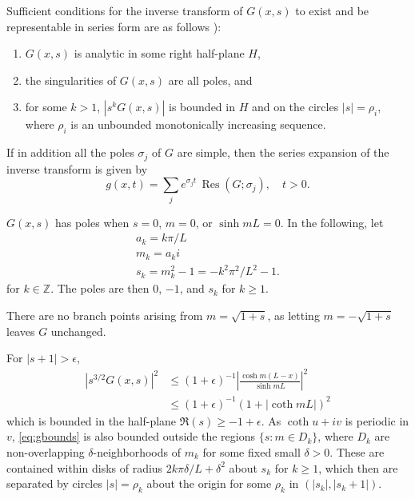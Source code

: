 \documentclass[parskip=half]{scrartcl}
\DeclareMathOperator{\Res}{Res}
\begin{document}
Sufficient conditions for the inverse transform of $G(x,s)$ to exist
and be representable in series form are as follows
\parencite[][Theorem 4]{churchill1937}):
\begin{enumerate}
\item
    $G(x, s)$ is analytic in some right half-plane $H$,
\item
    the singularities of $G(x, s)$ are all poles, and
\item for some $k>1$, $|s^k G(x, s)|$ is bounded in $H$ and
    on the circles $|s|=\rho_i$, where $\rho_i$ is an unbounded monotonically
    increasing sequence.
\end{enumerate}
If in addition all the poles $\sigma_j$ of $G$ are simple, then
the series expansion of the inverse transform is given by
\begin{equation}
    g(x,t) = \sum_j e^{\sigma_j t}\, \Res(G;\sigma_j),\quad t>0.
\end{equation}

$G(x,s)$ has poles when $s=0$, $m=0$, or $\sinh mL=0$.
In the following, let
\begin{gather*}
    a_k = k\pi /L\\
    m_k = a_k i\\
    s_k = m_k^2 -1 = -k^2\pi^2/L^2-1.
\end{gather*}
for $k\in\mathbb{Z}$.
The poles are then $0$, $-1$, and $s_k$ for $k\geq 1$.

There are no branch points
arising from $m=\sqrt{1+s}$, as letting $m=-\sqrt{1+s}$ leaves $G$ unchanged.

For $|s+1|>\epsilon$,
\begin{equation}
    \begin{aligned}
	|s^{3/2}G(x,s)|^2
	    & \leq (1+\epsilon)^{-1} \left| \frac{\cosh m(L-x)}{\sinh mL} \right|^2
	\\
	    & \leq (1+\epsilon)^{-1} (1+|\coth mL|)^2
    \label{eq:gbounds}
    \end{aligned}
\end{equation}
which is bounded in the half-plane $\Re(s) \geq  -1+\epsilon$. 
As $\coth u+iv$ is periodic in $v$, \eqref{eq:gbounds} is also bounded outside
the regions $\{s: m\in D_k\}$, where $D_k$ are non-overlapping $\delta$-neighborhoods of $m_k$
for some fixed small $\delta>0$. These are contained within disks of radius
$2k\pi\delta/L+\delta^2$ about $s_k$ for $k\geq 1$, which then are separated by
circles $|s|=\rho_k$ about the origin for some $\rho_k$ in $(|s_k|, |s_k+1|)$.
\end{document}
